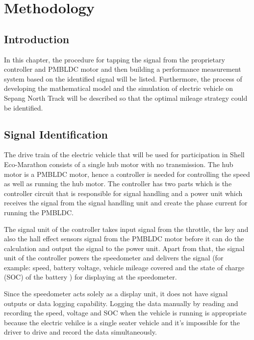 \chapter{Methodology}\label{chap:methodology}
\section{Introduction}
In this chapter, the procedure for tapping the signal from the proprietary controller and PMBLDC motor and then building a performance measurement system based on the identified signal will be listed. Furthermore, the process of developing the mathematical model and the simulation of electric vehicle on Sepang North Track will be described so that the optimal mileage strategy could be identified.


\section{Signal Identification}
The drive train of the electric vehicle that will be used for participation in Shell Eco-Marathon consists of a single hub motor with no transmission. The hub motor is a PMBLDC motor, hence a controller is needed for controlling the speed as well as running the hub motor. The controller has two parts which is the controller circuit that is responsible for signal handling and a power unit which receives the signal from the signal handling unit and create the phase current for running the PMBLDC.

The signal unit of the controller takes input signal from the throttle, the key and also the hall effect sensors signal from the PMBLDC motor before it can do the calculation and output the signal to the power unit. Apart from that, the signal unit of the controller powers the speedometer and delivers the signal (for example:  speed, battery voltage, vehicle mileage covered and the state of charge (SOC) of the battery ) for displaying at the speedometer.

Since the speedometer acts solely as a display unit, it does not have signal outputs or data logging capability. Logging the data manually by reading and recording the speed, voltage and SOC when the vehicle is running is appropriate because the electric vehilce is a single seater vehicle and it's impossible for the driver to drive and record the data simultaneously. 

